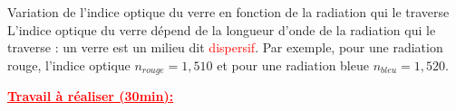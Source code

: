 \begin{doc}{Variation de l'indice optique du verre en fonction de la radiation qui le traverse}
    L'indice optique du verre dépend de la longueur d'onde de la radiation qui le traverse : un verre est un milieu dit \textcolor{red}{dispersif}. Par exemple, pour une radiation rouge, l'indice optique $n_{rouge}=1,510$ et pour une radiation bleue $n_{bleu}=1,520$.
\end{doc}
\begin{large}
    \textbf{\textcolor{red}{\underline{Travail à réaliser (30min):}}}
\end{large}
\\

